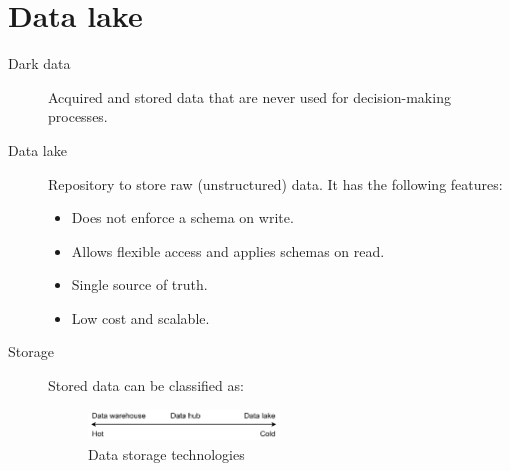 \chapter{Data lake}

\begin{description}
    \item[Dark data] 
        Acquired and stored data that are never used for decision-making processes.

    \item[Data lake] 
        Repository to store raw (unstructured) data.
        It has the following features:
        \begin{itemize}
            \item Does not enforce a schema on write.
            \item Allows flexible access and applies schemas on read.
            \item Single source of truth.
            \item Low cost and scalable.
        \end{itemize}

    \item[Storage]
        Stored data can be classified as:

        \begin{figure}[ht]
            \centering
            \includegraphics[width=0.5\textwidth]{img/_storage.pdf}
            \caption{Data storage technologies}
        \end{figure}
\end{description}


